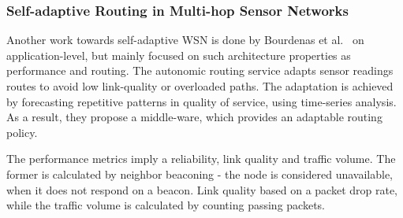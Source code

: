 \subsubsection*{Self-adaptive Routing in Multi-hop Sensor Networks}

Another work towards self-adaptive WSN is done by Bourdenas et
al.~\cite{bourdenas11} on application-level, but mainly focused on such
architecture properties as performance and routing. The autonomic routing
service adapts sensor readings routes to avoid low link-quality or overloaded
paths. The adaptation is achieved by forecasting repetitive patterns in quality
of service, using time-series analysis. As a result, they propose a middle-ware,
which provides an adaptable routing policy.

The performance metrics imply a reliability, link quality and traffic volume.
The former is calculated by neighbor beaconing - the node is considered unavailable,
when it does not respond on a beacon. Link quality based on a packet drop rate,
while the traffic volume is calculated by counting passing packets.